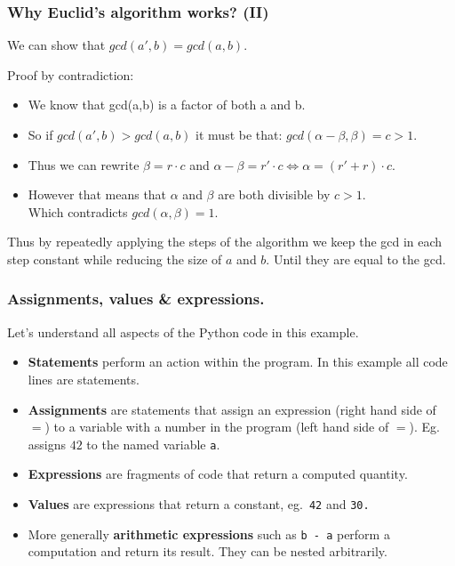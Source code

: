 \documentclass{beamer} %
\newcommand\emc[1]{\textcolor{brightblue}{\textbf{#1}}}
\begin{document}
\begin{frame}
\frametitle{Why Euclid's algorithm works? (II)}

We can show that $gcd(a', b) = gcd(a,b)$.

Proof by contradiction: 

\begin{itemize}
\item We know that gcd(a,b) is a factor of both a and b. 
\item So if $gcd(a', b) > gcd(a,b)$ it must be that:
$gcd(\alpha - \beta, \beta) = c > 1$. 
\item Thus we can rewrite $\beta = r \cdot c$ and $\alpha - \beta = r' \cdot c \Leftrightarrow \alpha = (r' + r) \cdot c $. 
\item However that means that $\alpha$ and $\beta$ are both divisible by $c > 1$. \\ Which contradicts $gcd(\alpha, \beta) = 1$.
\end{itemize}

Thus by repeatedly applying the steps of the algorithm we keep the gcd in each step constant while reducing the size of $a$ and $b$. Until they are equal to the gcd.

\end{frame}




\begin{frame}
\frametitle{Assignments, values \& expressions.}

Let's understand all aspects of the Python code in this example.
\begin{itemize}
\item \emc{Statements} perform an action within the program. In this example all code lines are statements.
\item \emc{Assignments} are statements that assign an expression (right hand side of $=$) to a variable with a number in the program (left hand side of $=$). Eg.\  assigns $42$ to the named variable \texttt{a}.
\item \emc{Expressions} are fragments of code that return a computed quantity.
\item \emc{Values} are expressions that return a constant, eg.\ \texttt{42} and \texttt{30.}
\item More generally \emc{arithmetic expressions} such as \texttt{b - a} perform a computation and return its result. They can be nested arbitrarily.
\end{itemize}

\end{frame}
\end{document}
